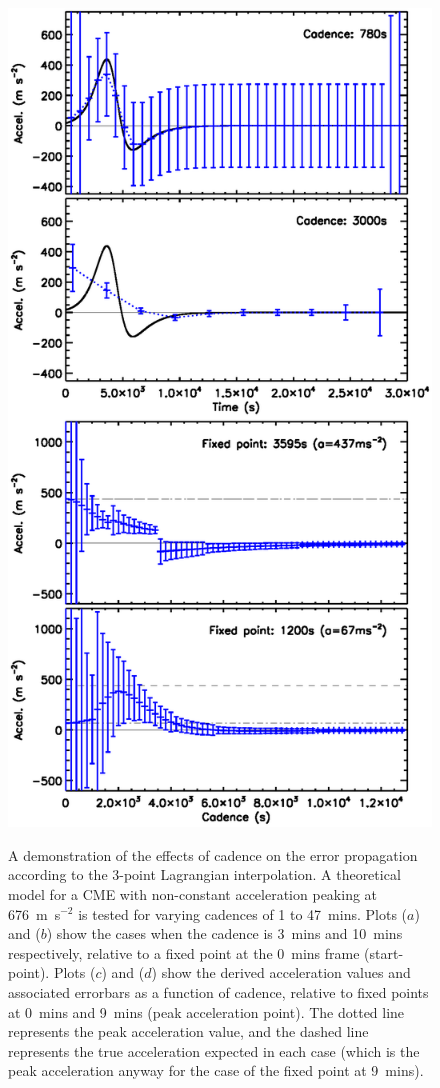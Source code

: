 \documentclass[structabstract]{aa}
\begin{document}
\begin{figure}[ht]
\centering
{\includegraphics[scale=0.55, trim=15 50 0 40, clip=true]{images/fig_cadence_4.eps}}
\caption{A demonstration of the effects of cadence on the error propagation according to the 3-point Lagrangian interpolation. A theoretical model for a CME with non-constant acceleration peaking at 676~m~s$^{-2}$ is tested for varying cadences of 1 to 47~mins. Plots ($a$) and ($b$) show the cases when the cadence is 3~mins and 10~mins respectively, relative to a fixed point at the 0~mins frame (start-point). Plots ($c$) and ($d$) show the derived acceleration values and associated errorbars as a function of cadence, relative to fixed points at 0~mins and 9~mins (peak acceleration point). The dotted line represents the peak acceleration value, and the dashed line represents the true acceleration expected in each case (which is the peak acceleration anyway for the case of the fixed point at 9~mins).}
\label{fig_cadence_4}
\end{figure}
\end{document}
